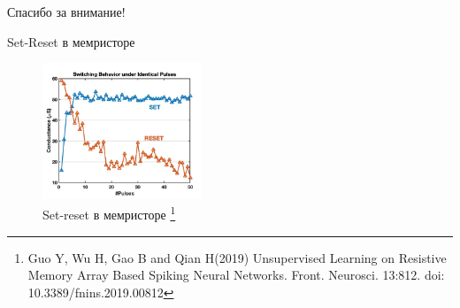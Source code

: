 \documentclass{beamer}%
\begin{document}
\begin{frame}[plain]
\vfill
\centerline{Спасибо за внимание!}
\vfill\vfill
\end{frame}

\begin{frame}{Set-Reset в мемристоре}
    \begin{figure}
        \centering
        \includegraphics[width=180px]{img/memristor-set-reset.jpg}
        \caption{Set-reset в мемристоре%
    \footnote{%
    Guo Y, Wu H, Gao B and Qian H(2019) Unsupervised Learning on Resistive Memory Array Based Spiking Neural Networks. Front. Neurosci. 13:812. doi: 10.3389/fnins.2019.00812
    }%
  }
    \end{figure}
\end{frame}
\end{document}
